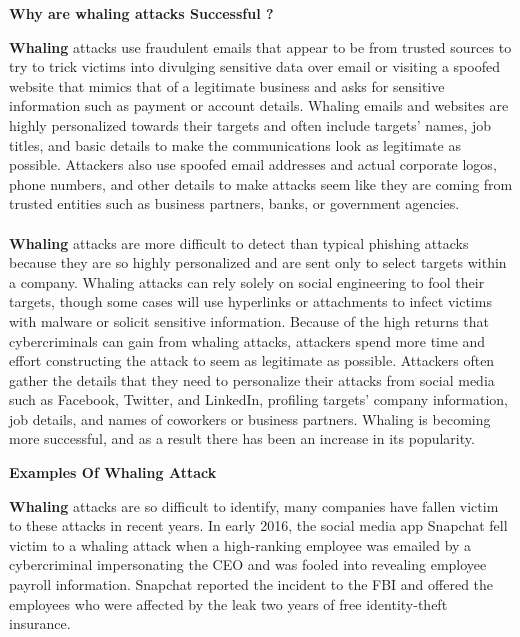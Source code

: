 \documentclass[15pt]{article}
\begin{document}
  \begin{Large}  \begin{center}
   \textbf{Why are whaling attacks Successful ?}
    \end{center} \end{Large} 
  
   \textbf{Whaling} attacks use fraudulent emails that appear to be from trusted sources to try to trick victims into divulging sensitive data over email or visiting a spoofed website that mimics that of a legitimate business and asks for sensitive information such as payment or account details. Whaling emails and websites are highly personalized towards their targets and often include targets’ names, job titles, and basic details to make the communications look as legitimate as possible. Attackers also use spoofed email addresses and actual corporate logos, phone numbers, and other details to make attacks seem like they are coming from trusted entities such as business partners, banks, or government agencies.\\
 \\  \textbf{Whaling} attacks are more difficult to detect than typical phishing attacks because they are so highly personalized and are sent only to select targets within a company. Whaling attacks can rely solely on social engineering to fool their targets, though some cases will use hyperlinks or attachments to infect victims with malware or solicit sensitive information. Because of the high returns that cybercriminals can gain from whaling attacks, attackers spend more time and effort constructing the attack to seem as legitimate as possible. Attackers often gather the details that they need to personalize their attacks from social media such as Facebook, Twitter, and LinkedIn, profiling targets’ company information, job details, and names of coworkers or business partners. Whaling is becoming more successful, and as a result there has been an increase in its popularity. \\
 
 \begin{Large}  \begin{center}
 \textbf{Examples Of Whaling Attack }
 \end{center} \end{Large}  
 
    \textbf{Whaling} attacks are so difficult to identify, many companies have fallen victim to these attacks in recent years. In early 2016, the social media app Snapchat fell victim to a whaling attack when a high-ranking employee was emailed by a cybercriminal impersonating the CEO and was fooled into revealing employee payroll information. Snapchat reported the incident to the FBI and offered the employees who were affected by the leak two years of free identity-theft insurance.
\end{document}
